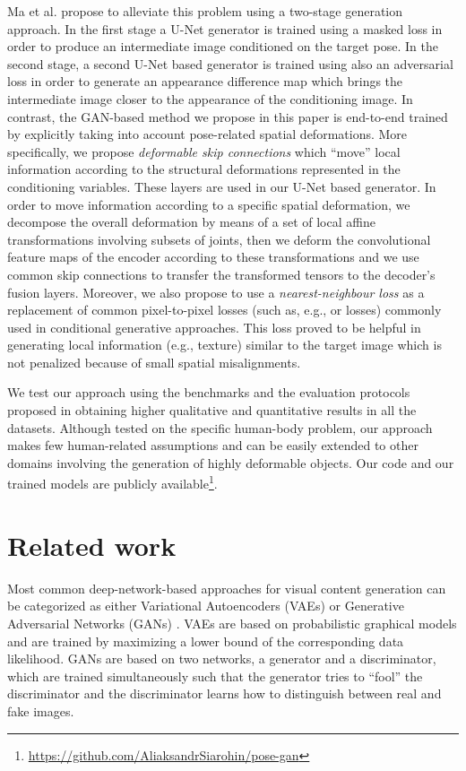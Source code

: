 \documentclass[10pt,twocolumn,letterpaper]{article}
\begin{document}
Ma et al. \cite{ma2017pose} propose to alleviate this problem using a two-stage generation approach. In the first stage a U-Net generator is trained using a masked  loss in order to produce an intermediate image conditioned on the target pose. In the second stage, a second U-Net based generator is trained using also an adversarial loss in order to generate an appearance difference map which brings the  intermediate image closer to the appearance of the conditioning image.
In contrast, the GAN-based method we propose in this paper  is end-to-end trained
  by explicitly taking into account  pose-related spatial deformations. More specifically, we propose {\em deformable skip connections} which ``move'' local information according to the structural deformations represented in the  conditioning variables. These layers are used  in our U-Net based generator. 
In order to  move information according to a specific spatial deformation,  we decompose the overall  deformation by means of a set of 
local affine  transformations involving subsets of joints, 
then we deform the convolutional feature maps of the encoder  according to these  transformations and we use common skip connections to transfer the transformed tensors to the decoder's fusion layers.
Moreover, we also propose to use a {\em nearest-neighbour 
loss} as a replacement of common pixel-to-pixel losses (such as, e.g.,  or  losses) commonly used in conditional generative approaches. This loss proved to be helpful in generating local information (e.g., texture) similar to the target image which is not penalized because of small spatial misalignments.

We test our approach using the benchmarks and the evaluation protocols proposed in \cite{ma2017pose} obtaining higher qualitative and quantitative results in all the datasets.
Although tested on the specific human-body problem, our approach makes few human-related assumptions and can be easily extended to other domains involving the generation of  highly deformable objects.
Our code   and our trained models
are publicly available\footnote{\url{https://github.com/AliaksandrSiarohin/pose-gan}}.
 \section{Related work}
\label{Related}

Most common deep-network-based
 approaches for visual content generation can be categorized as either Variational Autoencoders (VAEs) \cite{kingma2013auto} or Generative Adversarial Networks (GANs) \cite{goodfellow2014generative}. VAEs  are based on probabilistic graphical models and are trained by maximizing a lower bound of the corresponding data likelihood. GANs are based on two networks, a generator and a discriminator, which are trained simultaneously such that the generator tries to ``fool'' the discriminator and the discriminator learns how to distinguish between real and fake images.
\end{document}
